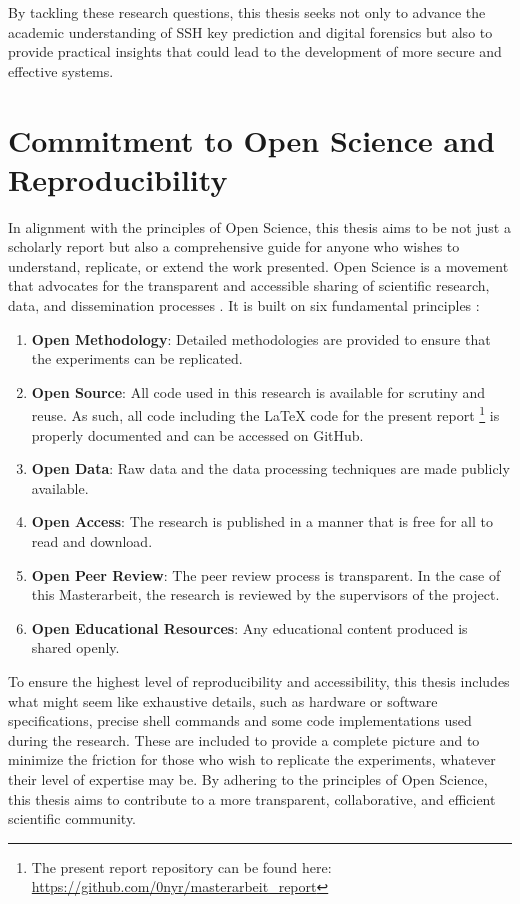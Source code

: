 By tackling these research questions, this thesis seeks not only to advance the academic understanding of SSH key prediction and digital forensics but also to provide practical insights that could lead to the development of more secure and effective systems.

\section{Commitment to Open Science and Reproducibility}

In alignment with the principles of Open Science, this thesis aims to be not just a scholarly report but also a comprehensive guide for anyone who wishes to understand, replicate, or extend the work presented. Open Science is a movement that advocates for the transparent and accessible sharing of scientific research, data, and dissemination processes \cite{WhyNotShareData22}. It is built on six fundamental principles \cite{WasIstOpenScience23}:

\begin{enumerate}
    \item \textbf{Open Methodology}: Detailed methodologies are provided to ensure that the experiments can be replicated.
    \item \textbf{Open Source}: All code used in this research is available for scrutiny and reuse. As such, all code including the \LaTeX{} code for the present report \footnote{The present report repository can be found here: \url{https://github.com/0nyr/masterarbeit\_report}} is properly documented and can be accessed on GitHub. 
    \item \textbf{Open Data}: Raw data and the data processing techniques are made publicly available.
    \item \textbf{Open Access}: The research is published in a manner that is free for all to read and download.
    \item \textbf{Open Peer Review}: The peer review process is transparent. In the case of this Masterarbeit, the research is reviewed by the supervisors of the project.
    \item \textbf{Open Educational Resources}: Any educational content produced is shared openly.
\end{enumerate}

To ensure the highest level of reproducibility and accessibility, this thesis includes what might seem like exhaustive details, such as hardware or software specifications, precise shell commands and some code implementations used during the research. These are included to provide a complete picture and to minimize the friction for those who wish to replicate the experiments, whatever their level of expertise may be. By adhering to the principles of Open Science, this thesis aims to contribute to a more transparent, collaborative, and efficient scientific community.
	
